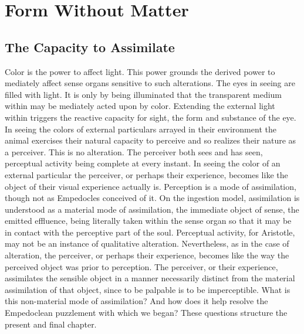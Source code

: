 \chapter{Form Without Matter} %
\label{cha:form_without_matter}

\section{The Capacity to Assimilate} %
\label{sec:the_capacity_to_assimilate}

Color is the power to affect light. This power grounds the derived power to mediately affect sense organs sensitive to such alterations. The eyes in seeing are filled with light. It is only by being illuminated that the transparent medium within may be mediately acted upon by color. Extending the external light within triggers the reactive capacity for sight, the form and substance of the eye. In seeing the colors of external particulars arrayed in their environment the animal exercises their natural capacity to perceive and so realizes their nature as a perceiver. This is no alteration. The perceiver both sees and has seen, perceptual activity being complete at every instant. In seeing the color of an external particular the perceiver, or perhaps their experience, becomes like the object of their visual experience actually is. Perception is a mode of assimilation, though not as Empedocles conceived of it. On the ingestion model, assimilation is understood as a material mode of assimilation, the immediate object of sense, the emitted effluence, being literally taken within the sense organ so that it may be in contact with the perceptive part of the soul. Perceptual activity, for Aristotle, may not be an instance of qualitative alteration. Nevertheless, as in the case of alteration, the perceiver, or perhaps their experience, becomes like the way the perceived object was prior to perception. The perceiver, or their experience, assimilates the sensible object in a manner necessarily distinct from the material assimilation of that object, since to be palpable is to be imperceptible. What is this non-material mode of assimilation? And how does it help resolve the Empedoclean puzzlement with which we began? These questions structure the present and final chapter. 

